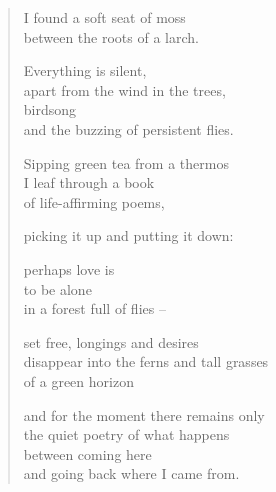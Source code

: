 \begin{verse}
I found a soft seat of moss\\
between the roots of a larch.

Everything is silent,\\
apart from the wind in the trees,\\
birdsong\\
and the buzzing of persistent flies.

Sipping green tea from a thermos\\
I leaf through a book\\
of life-affirming poems,

picking it up and putting it down:

perhaps love is\\
to be alone\\
in a forest full of flies --

set free, longings and desires\\
disappear into the ferns and tall grasses\\
of a green horizon

and for the moment there remains only\\
the quiet poetry of what happens\\
between coming here\\
and going back where I came from.
\end{verse}

